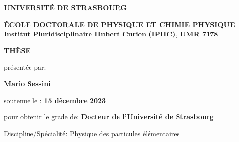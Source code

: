 \begin{titlepage}

 
    
      \begin{center}
      
      
      \vspace*{-1.2cm} %
      
      {\Large \hspace{0.6cm} \textbf{UNIVERSITÉ DE STRASBOURG}}\\
      \vspace*{1.5cm} %
      
      {\large \textbf{ÉCOLE DOCTORALE DE PHYSIQUE ET CHIMIE PHYSIQUE}}\\
      \textbf{Institut Pluridisciplinaire Hubert Curien (IPHC), UMR 7178}\\
      
      \vspace*{1.5cm} %
      
      {\LARGE \textbf{TH\`{E}SE}}
      
      présentée par:
      
      \vspace*{0.3cm}
      
      {\Large \textbf{Mario Sessini}}
      
      soutenue le : \textbf{15 décembre 2023}
      
      
      \vspace*{0.5cm}
      
      pour obtenir le grade de: \textbf{Docteur de l'Université de Strasbourg}
      
      
      Discipline/Spécialité: Physique des particules élémentaires
      
      
      \vspace*{1cm}
      
      \fbox{
            \parbox{\textwidth}{\centering \LARGE \textbf{Recherche de violation de CP dans le couplage de Yukawa du lepton $\tau$ avec la méthode du vecteur polarimétrique dans les données du Run 2 de l'expérience CMS auprès du LHC}} %
      }
      

\end{center}
\end{titlepage}
